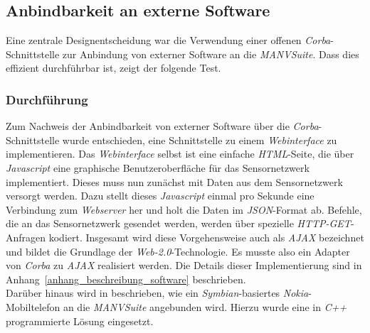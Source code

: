 \subsection{Anbindbarkeit an externe Software}\label{anbindbarkeit_an_externe_software}
Eine zentrale Designentscheidung war die Verwendung einer offenen \emph{Corba}-Schnittstelle zur Anbindung
von externer Software an die \emph{MANVSuite}. Dass dies effizient durchführbar ist, zeigt der folgende
Test.

\subsubsection{Durchführung}
Zum Nachweis der Anbindbarkeit von externer Software über die \emph{Corba}-Schnittstelle wurde entschieden,
eine Schnittstelle zu einem \emph{Webinterface} zu implementieren. Das \emph{Webinterface} selbst ist
eine einfache \emph{HTML}-Seite, die über \emph{Javascript} eine graphische Benutzeroberfläche für das
Sensornetzwerk implementiert. Dieses muss nun zunächst mit Daten aus dem Sensornetzwerk versorgt werden. 
Dazu stellt dieses \emph{Javascript} einmal pro Sekunde eine Verbindung zum \emph{Webserver} her
und holt die Daten im \emph{JSON}-Format ab. Befehle, die an das Sensornetzwerk gesendet werden,
werden über spezielle \emph{HTTP-GET}-Anfragen kodiert. Insgesamt wird
diese Vorgehensweise auch als \emph{AJAX} bezeichnet und bildet die Grundlage der \emph{Web-2.0}-Technologie.
Es musste also ein Adapter von \emph{Corba} zu \emph{AJAX} realisiert werden. Die Details dieser
Implementierung sind in Anhang~\ref{anhang_beschreibung_software} beschrieben.\\
Darüber hinaus wird in \cite{Jan} beschrieben, wie ein \emph{Symbian}-basiertes \emph{Nokia}-Mobiltelefon 
an die \emph{MANVSuite} angebunden wird. Hierzu wurde eine in \emph{C++} programmierte Lösung 
eingesetzt.

